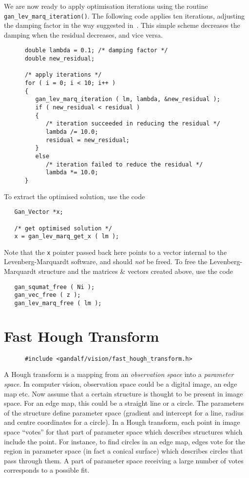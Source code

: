 We are now ready to apply optimisation iterations using the routine
{\tt gan\_lev\_marq\_iteration()}. The following code
applies ten iterations, adjusting the damping factor in the way suggested
in~\cite{Press:etal:88}. This simple scheme decreases the damping when the
residual decreases, and vice versa.
\begin{verbatim}
      double lambda = 0.1; /* damping factor */
      double new_residual;

      /* apply iterations */
      for ( i = 0; i < 10; i++ )
      {
         gan_lev_marq_iteration ( lm, lambda, &new_residual );
         if ( new_residual < residual )
         {
            /* iteration succeeded in reducing the residual */
            lambda /= 10.0;
            residual = new_residual;
         }
         else
            /* iteration failed to reduce the residual */
            lambda *= 10.0;
      }
\end{verbatim}
To extract the optimised solution, use the code
\begin{verbatim}
   Gan_Vector *x;

   /* get optimised solution */
   x = gan_lev_marq_get_x ( lm );
\end{verbatim}
Note that the {\tt x} pointer passed back here points to a vector internal
to the Levenberg-Marquardt software, and should {\em not} be freed.
To free the Levenberg-Marquardt structure and the matrices \& vectors
created above, use the code
\begin{verbatim}
   gan_squmat_free ( Ni );
   gan_vec_free ( z );
   gan_lev_marq_free ( lm );
\end{verbatim}

\section{Fast Hough Transform}
\begin{verbatim}
      #include <gandalf/vision/fast_hough_transform.h>
\end{verbatim}
A Hough transform is a mapping from an {\em observation space} into a
{\em parameter space}. In computer vision, observation space could be a
digital image, an edge map etc. Now assume that
a certain structure is thought to be present in image space. For an edge
map, this could be a straight line or a circle. The parameters of the
structure define parameter space (gradient and intercept for a line, radius
and centre coordinates for a circle). In a Hough transform, each point
in image space ``votes'' for that part of parameter space which describes
structures which include the point. For instance, to find circles in an
edge map, edges vote for the region in parameter space (in fact a conical
surface) which describes circles that pass through them. A part of parameter
space receiving a large number of votes corresponds to a possible fit.

